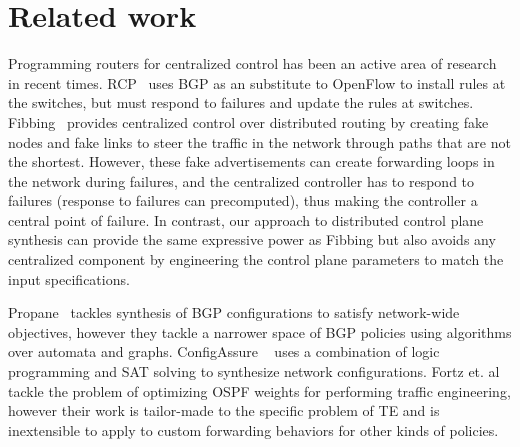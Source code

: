 \section{Related work}
Programming routers for centralized control has been an
active area of research in recent times. RCP~\cite{rcp} uses
BGP as an substitute to OpenFlow to install rules at the 
switches, but must respond to failures and update the 
rules at switches. Fibbing~\cite{fibbing} provides 
centralized control over distributed routing by creating 
fake nodes and fake links to steer the traffic in the 
network through paths that are not the shortest. However, 
these fake advertisements can create forwarding loops in the
network during failures, and the centralized controller 
has to respond to failures (response to failures can precomputed),
thus making the controller a central point of failure. In contrast,
our approach to distributed control plane synthesis can provide
the same expressive power as Fibbing but also
avoids any centralized component by engineering 
the control plane parameters to match the input specifications. 

 Propane~\cite{propane} 
tackles synthesis of BGP configurations to satisfy network-wide
objectives, however they tackle a narrower space of BGP policies
using algorithms over automata and graphs. ConfigAssure
~\cite{configassure} uses a combination of 
logic programming and SAT solving to synthesize network
configurations. Fortz et. al~\cite{ospf-te} tackle the 
problem of optimizing OSPF weights for performing traffic
engineering, however their work is tailor-made to the 
specific problem of TE and is inextensible to apply 
to custom forwarding behaviors for other kinds of policies.

